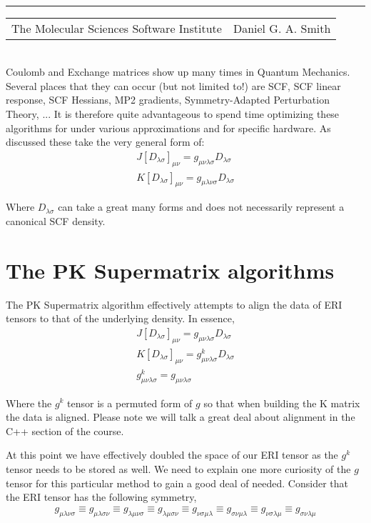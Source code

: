 \documentclass[aip,jcp,preprint,superscriptaddress,floatfix]{revtex4-1}
\renewcommand{\title}[1]{\textbf{\large{#1}}\\}
\newcommand{\leftright}[2]{\begin{tabularx}{\textwidth}{X>{\raggedleft}X}#1%
& #2\\\end{tabularx}\\[-1cm]}
\begin{document}
\title{}
\rule{\textwidth}{1pt}
\leftright{The Molecular Sciences Software Institute}{Daniel G. A. Smith} %

\bigskip
Coulomb and Exchange matrices show up many times in Quantum Mechanics. Several places that they can occur (but not limited to!) are SCF, SCF linear response, SCF Hessians, MP2 gradients, Symmetry-Adapted Perturbation Theory, ... It is therefore quite advantageous to spend time optimizing these algorithms for under various approximations and for specific hardware. As discussed these take the very general form of:
\begin{eqnarray}
J[D_{\lambda \sigma}]_{\mu \nu} =   g_{\mu \nu \lambda \sigma} D_{\lambda \sigma}\\
K[D_{\lambda \sigma}]_{\mu \nu} =   g_{\mu \lambda \nu \sigma} D_{\lambda \sigma} 
\end{eqnarray}

Where $D_{\lambda \sigma}$ can take a great many forms and does not necessarily represent a canonical SCF density.


\section{The PK Supermatrix algorithms}

The PK Supermatrix algorithm\cite{Raffenetti:1973:335} effectively attempts to align the data of ERI tensors to that of the underlying density. In essence,
 \begin{eqnarray}
J[D_{\lambda \sigma}]_{\mu \nu} =   g_{\mu \nu \lambda \sigma} D_{\lambda \sigma}\\
K[D_{\lambda \sigma}]_{\mu \nu} =   g^k_{\mu  \nu \lambda\sigma} D_{\lambda \sigma} \\
g^k_{\mu  \nu \lambda\sigma} = g_{\mu \nu \lambda \sigma} 
 \end{eqnarray}

Where the $g^k$ tensor is a permuted form of $g$ so that when building the K matrix the data is aligned.
Please note we will talk a great deal about alignment in the C++ section of the course.

At this point we have effectively doubled the space of our ERI tensor as the $g^k$ tensor needs to be stored as well. We need to explain one more curiosity of the $g$ tensor for this particular method to gain a good deal of needed. Consider that the ERI tensor has the following symmetry,
 \begin{eqnarray}
 g_{\mu \lambda \nu \sigma} \equiv g_{\mu \lambda \sigma \nu} \equiv
  g_{\lambda\mu \nu \sigma} \equiv g_{\lambda\mu \sigma \nu} \equiv
   g_{ \nu \sigma\mu \lambda} \equiv g_{ \sigma \nu\mu \lambda} \equiv
  g_{ \nu \sigma\lambda\mu} \equiv g_{ \sigma \nu\lambda\mu}
 \end{eqnarray}
 
\end{document}
